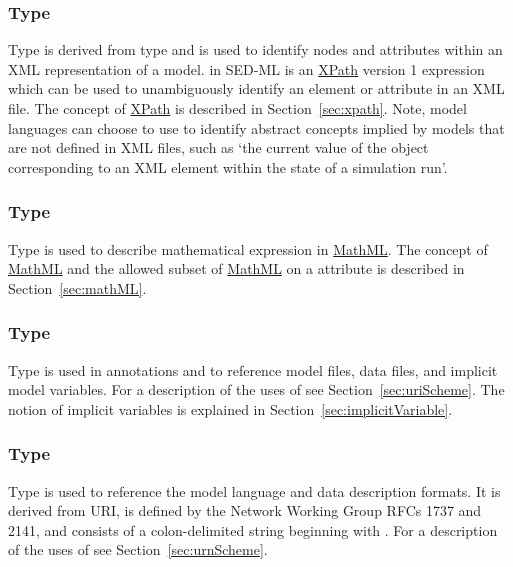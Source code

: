 \subsubsection[\element{XPath}]{Type }
\label{type:xpath}
Type  is derived from type  and is used to identify nodes and attributes within an XML representation of a model.  in SED-ML is an \hyperref[sec:xpath]{XPath} version 1 expression which can be used to unambiguously identify an element or attribute in an XML file. The concept of \hyperref[sec:xpath]{XPath} is described in Section~\ref{sec:xpath}.  Note, model languages can choose to use  to identify abstract concepts implied by models that are not defined in XML files, such as `the current value of the object corresponding to an XML element within the state of a simulation run'.

\subsubsection[\element{MathML}]{Type }
\label{type:mathml}
Type  is used to describe mathematical expression in \hyperref[sec:mathML]{MathML}. The concept of \hyperref[sec:mathML]{MathML} and the allowed subset of \hyperref[sec:mathML]{MathML} on a  attribute is described in Section~\ref{sec:mathML}.

\subsubsection[\element{anyURI}]{Type }
\label{type:anyURI}
Type  is used in annotations and to reference model files, data files, and implicit model variables. For a description of the uses of  see Section~\ref{sec:uriScheme}.  The notion of implicit variables is explained in Section~\ref{sec:implicitVariable}.

\subsubsection[\element{URN}]{Type }
\label{type:urn}
Type  is used to reference the model language and data description formats.  It is derived from URI, is defined by the Network Working Group RFCs 1737 and 2141, and consists of a colon-delimited string beginning with .  For a description of the uses of  see Section~\ref{sec:urnScheme}.

